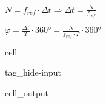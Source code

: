 \documentclass[letterpaper,10pt,english]{jupyterBook}
\begin{document}
\sphinxAtStartPar
{}

\begin{DUlineblock}{0em}
\item[] 
\end{DUlineblock}

\sphinxAtStartPar
{}

\begin{DUlineblock}{0em}
\item[] 
\end{DUlineblock}

\sphinxAtStartPar
\(N = f_{ref}\cdot \Delta t\Rightarrow \Delta t = \frac{N}{f_{ref}}\)

\sphinxAtStartPar
\(\varphi = \frac{\Delta t}{T}\cdot 360° = \frac{N}{f_{ref}\cdot T}\cdot 360°\)

\begin{DUlineblock}{0em}
\item[] 
\end{DUlineblock}

\begin{DUlineblock}{0em}
\item[] 
\end{DUlineblock}

\sphinxAtStartPar
{}

\begin{DUlineblock}{0em}
\item[] 
\end{DUlineblock}

\begin{sphinxuseclass}{cell}
\begin{sphinxuseclass}{tag_hide-input}\begin{sphinxVerbatimOutput}

\begin{sphinxuseclass}{cell_output}
\noindent{}

\end{sphinxuseclass}\end{sphinxVerbatimOutput}

\end{sphinxuseclass}
\end{sphinxuseclass}
\begin{DUlineblock}{0em}
\item[] 
\end{DUlineblock}
\end{document}
